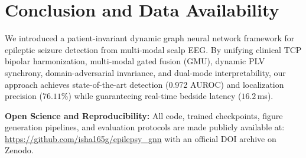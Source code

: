 \documentclass[journal]{IEEEtran}
\begin{document}
\section{Conclusion and Data Availability}
We introduced a patient-invariant dynamic graph neural network framework for epileptic seizure detection from multi-modal scalp EEG. By unifying clinical TCP bipolar harmonization, multi-modal gated fusion (GMU), dynamic PLV synchrony, domain-adversarial invariance, and dual-mode interpretability, our approach achieves state-of-the-art detection (0.972 AUROC) and localization precision ($76.11\%$) while guaranteeing real-time bedside latency ($16.2$\,ms). 

\textbf{Open Science and Reproducibility:} All code, trained checkpoints, figure generation pipelines, and evaluation protocols are made publicly available at: \url{https://github.com/isha165g/epilepsy_gnn} with an official DOI archive on Zenodo.



\end{document}
